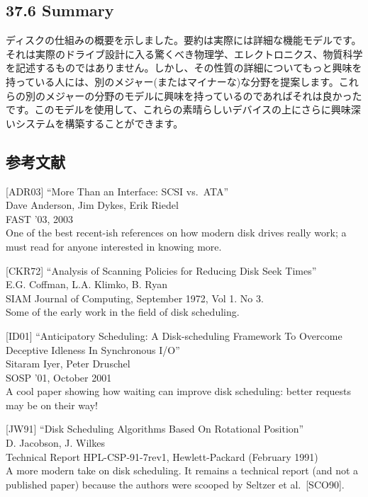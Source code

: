 \hypertarget{summary-24}{%
\subsection*{37.6 Summary}\label{summary-24}}

ディスクの仕組みの概要を示しました。要約は実際には詳細な機能モデルです。それは実際のドライブ設計に入る驚くべき物理学、エレクトロニクス、物質科学を記述するものではありません。しかし、その性質の詳細についてもっと興味を持っている人には、別のメジャー(またはマイナーな)な分野を提案します。これらの別のメジャーの分野のモデルに興味を持っているのであればそれは良かったです。このモデルを使用して、これらの素晴らしいデバイスの上にさらに興味深いシステムを構築することができます。

\hypertarget{ux53c2ux8003ux6587ux732e-24}{%
\subsection*{参考文献}\label{ux53c2ux8003ux6587ux732e-24}}

{[}ADR03{]} ``More Than an Interface: SCSI vs.~ATA''\\
Dave Anderson, Jim Dykes, Erik Riedel\\
FAST '03, 2003\\
One of the best recent-ish references on how modern disk drives really
work; a must read for anyone interested in knowing more.

{[}CKR72{]} ``Analysis of Scanning Policies for Reducing Disk Seek
Times''\\
E.G. Coffman, L.A. Klimko, B. Ryan\\
SIAM Journal of Computing, September 1972, Vol 1. No 3.\\
Some of the early work in the field of disk scheduling.

{[}ID01{]} ``Anticipatory Scheduling: A Disk-scheduling Framework To
Overcome Deceptive Idleness In Synchronous I/O''\\
Sitaram Iyer, Peter Druschel\\
SOSP '01, October 2001\\
A cool paper showing how waiting can improve disk scheduling: better
requests may be on their way!

{[}JW91{]} ``Disk Scheduling Algorithms Based On Rotational Position''\\
D. Jacobson, J. Wilkes\\
Technical Report HPL-CSP-91-7rev1, Hewlett-Packard (February 1991)\\
A more modern take on disk scheduling. It remains a technical report
(and not a published paper) because the authors were scooped by Seltzer
et al.~{[}SCO90{]}.

